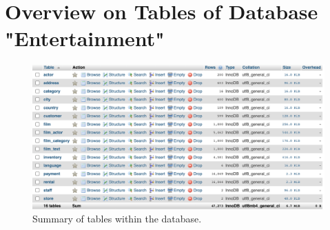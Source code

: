 \documentclass{article}
\begin{document}
\section{Overview on Tables of Database "Entertainment"}
	\begin{figure}[H]
		\includegraphics[width=\textwidth]{table_overview}
		\caption{Summary of tables within the database.}
	\end{figure}	
	
\end{document}
